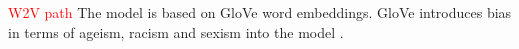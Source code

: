 \section{\infersent{}}\label{sec:impl-infersent}

\textcolor{red}{W2V path}
The \infersent{} model is based on GloVe word embeddings.
GloVe introduces bias in terms of ageism, racism and sexism into the model \cite{UniversalSentEnc2018}.